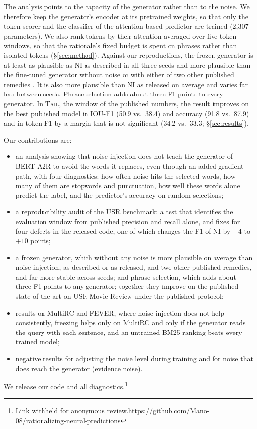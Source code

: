 \documentclass[11pt]{article}
\makeatletter
\newcommand{\TAIL}{\textup{\textsc{Tail}}}
\newcommand{\repolink}{\ifacl@anonymize Link withheld for anonymous review.\else\url{https://github.com/Mano-08/rationalizing-neural-predictions}\fi}
\makeatother
\begin{document}
The analysis points to the capacity of the generator rather than to the noise. We therefore keep the generator's encoder at its pretrained weights, so that only the token scorer and the classifier of the attention-based predictor are trained (2,307 parameters). We also rank tokens by their attention averaged over five-token windows, so that the rationale's fixed budget is spent on phrases rather than isolated tokens (\S\ref{sec:method}). Against our reproductions, the frozen generator is at least as plausible as NI as described in all three seeds and more plausible than the fine-tuned generator without noise or with either of two other published remedies \citep{liu2023dr,liu-etal-2025-exploring}. It is also more plausible than NI as released on average and varies far less between seeds. Phrase selection adds about three F1 points to every generator. In \TAIL, the window of the published numbers, the result improves on the best published model in IOU-F1 (50.9 vs.\ 38.4) and accuracy (91.8 vs.\ 87.9) and in token F1 by a margin that is not significant (34.2 vs.\ 33.3; \S\ref{sec:results}).

Our contributions are:
\begin{itemize}
  \setlength\itemsep{1pt}
  \item an analysis showing that noise injection does not teach the generator of BERT-A2R to avoid the words it replaces, even through an added gradient path, with four diagnostics: how often noise hits the selected words, how many of them are stopwords and punctuation, how well these words alone predict the label, and the predictor's accuracy on random selections;
  \item a reproducibility audit of the USR benchmark: a test that identifies the evaluation window from published precision and recall alone, and fixes for four defects in the released code, one of which changes the F1 of NI by $-4$ to $+10$ points;
  \item a frozen generator, which without any noise is more plausible on average than noise injection, as described or as released, and two other published remedies, and far more stable across seeds; and phrase selection, which adds about three F1 points to any generator; together they improve on the published state of the art on USR Movie Review under the published protocol;
  \item results on MultiRC and FEVER, where noise injection does not help consistently, freezing helps only on MultiRC and only if the generator reads the query with each sentence, and an untrained BM25 ranking beats every trained model;
  \item negative results for adjusting the noise level during training and for noise that does reach the generator (evidence noise).
\end{itemize}
We release our code and all diagnostics.\footnote{\repolink}
\end{document}
